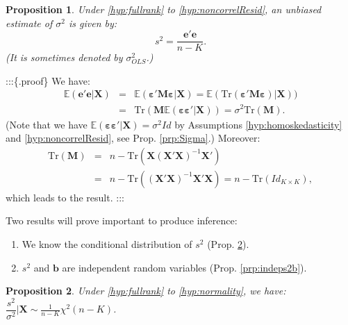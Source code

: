 \documentclass[
  12pt,
]{book}
\providecommand{\tightlist}{%
  \setlength{\itemsep}{0pt}\setlength{\parskip}{0pt}}
\newtheorem{proposition}{Proposition}[chapter]
\theoremstyle{definition}
\theoremstyle{definition}
\theoremstyle{definition}
\theoremstyle{definition}
\theoremstyle{remark}
\begin{document}
\begin{proposition}
\protect\hypertarget{prp:expects2}{}\label{prp:expects2}Under \ref{hyp:fullrank} to \ref{hyp:noncorrelResid}, an unbiased estimate of \(\sigma^2\) is given by:
\begin{equation}
s^2 = \frac{\mathbf{e}'\mathbf{e}}{n-K}.\label{eq:s2}
\end{equation}
(It is sometimes denoted by \(\sigma^2_{OLS}\).)
\end{proposition}

:::\{.proof\} We have:
\begin{eqnarray*}
\mathbb{E}(\mathbf{e}'\mathbf{e}|\mathbf{X})&=&\mathbb{E}(\boldsymbol{\varepsilon}'\mathbf{M}\boldsymbol{\varepsilon}|\mathbf{X})=\mathbb{E}(\mbox{Tr}(\boldsymbol{\varepsilon}'\mathbf{M}\boldsymbol{\varepsilon})|\mathbf{X}))\\
&=&\mbox{Tr}(\mathbf{M}\mathbb{E}(\boldsymbol{\varepsilon}\boldsymbol{\varepsilon}'|\mathbf{X}))=\sigma^2 \mbox{Tr}(\mathbf{M}).
\end{eqnarray*}
(Note that we have \(\mathbb{E}(\boldsymbol{\varepsilon}\boldsymbol{\varepsilon}'|\mathbf{X})=\sigma^2Id\) by Assumptions \ref{hyp:homoskedasticity} and \ref{hyp:noncorrelResid}, see Prop. \ref{prp:Sigma}.) Moreover:
\begin{eqnarray*}
\mbox{Tr}(\mathbf{M})&=&n-\mbox{Tr}(\mathbf{X}(\mathbf{X}'\mathbf{X})^{-1}\mathbf{X}')\\
&=&n-\mbox{Tr}((\mathbf{X}'\mathbf{X})^{-1}\mathbf{X}'\mathbf{X})=n-\mbox{Tr}(Id_{K \times K}),
\end{eqnarray*}
which leads to the result.
:::

Two results will prove important to produce inference:

\begin{enumerate}
\def\labelenumi{\roman{enumi}.}
\tightlist
\item
  We know the conditional distribution of \(s^2\) (Prop. \ref{prp:s2distri}).
\item
  \(s^2\) and \(\mathbf{b}\) are independent random variables (Prop. \ref{prp:indeps2b}).
\end{enumerate}

\begin{proposition}
\protect\hypertarget{prp:s2distri}{}\label{prp:s2distri}Under \ref{hyp:fullrank} to \ref{hyp:normality}, we have: \(\dfrac{s^2}{\sigma^2} | \mathbf{X} \sim \frac{1}{n-K}\chi^2(n-K)\).
\end{proposition}
\end{document}
